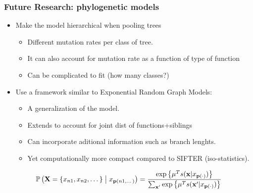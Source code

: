 \documentclass[aspectratio=169, 9pt]{beamer}\usepackage[]{graphicx}\usepackage[]{color}
\begin{document}
\begin{frame}[t]
\frametitle{Future Research: phylogenetic models}

\begin{itemize}
\item Make the model hierarchical when pooling trees\pause
\begin{itemize}
\item Different mutation rates per class of tree.
\item It can also account for mutation rate as a function of type of function
\item Can be complicated to fit (how many classes?)
\end{itemize}\pause
\item Use a framework similar to Exponential Random Graph Models:\pause
\begin{itemize}
\item A generalization of the model.
\item Extends to account for joint dist of functions+siblings
\item Can incorporate aditional information such as branch lenghts.
\item Yet computationally more compact compared to SIFTER (iso-statistics).
\end{itemize}
\end{itemize}
\pause
$$
\Prcond{\Ann=\{\ann{n1}, \ann{n2},\dots\}}{\ann{\parent{n1, \dots}}} = \frac{\exp{\mu^{T} s(\mathbf{x}|\ann{\parent{\cdot}})}}{\sum_{\mathbf{x}'}\exp{\mu^{T} s(\mathbf{x}'|\ann{\parent{\cdot}})}}
$$


\end{frame}
\end{document}
